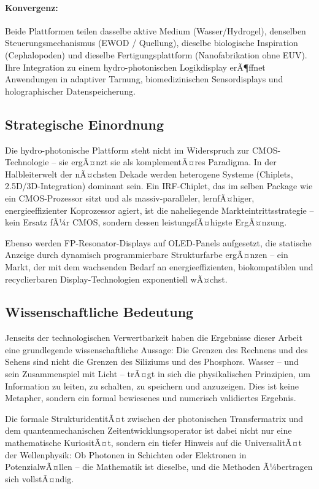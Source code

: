 ﻿\documentclass[a4paper,12pt]{scrreprt}
\theoremstyle{definition}
\begin{document}
\paragraph{Konvergenz:}
Beide Plattformen teilen dasselbe aktive Medium (Wasser/Hydrogel), denselben
Steuerungsmechanismus (EWOD / Quellung), dieselbe biologische Inspiration
(Cephalopoden) und dieselbe Fertigungsplattform (Nanofabrikation ohne EUV).
Ihre Integration zu einem hydro-photonischen Logikdisplay erÃ¶ffnet
Anwendungen in adaptiver Tarnung, biomedizinischen Sensordisplays und
holographischer Datenspeicherung.

\subsection{Strategische Einordnung}

Die hydro-photonische Plattform steht nicht im Widerspruch zur
CMOS-Technologie -- sie ergÃ¤nzt sie als komplementÃ¤res Paradigma.
In der Halbleiterwelt der nÃ¤chsten Dekade werden heterogene Systeme
(Chiplets, 2.5D/3D-Integration) dominant sein. Ein IRF-Chiplet, das im
selben Package wie ein CMOS-Prozessor sitzt und als massiv-paralleler,
lernfÃ¤higer, energieeffizienter Koprozessor agiert, ist die naheliegende
Markteintrittsstrategie -- kein Ersatz fÃ¼r CMOS, sondern dessen
leistungsfÃ¤higste ErgÃ¤nzung.

Ebenso werden FP-Resonator-Displays auf OLED-Panels aufgesetzt, die
statische Anzeige durch dynamisch programmierbare Strukturfarbe ergÃ¤nzen --
ein Markt, der mit dem wachsenden Bedarf an energieeffizienten,
biokompatiblen und recyclierbaren Display-Technologien exponentiell wÃ¤chst.

\subsection{Wissenschaftliche Bedeutung}

Jenseits der technologischen Verwertbarkeit haben die Ergebnisse dieser
Arbeit eine grundlegende wissenschaftliche Aussage: Die Grenzen des Rechnens
und des Sehens sind nicht die Grenzen des Siliziums und des Phosphors.
Wasser -- und sein Zusammenspiel mit Licht -- trÃ¤gt in sich die physikalischen
Prinzipien, um Information zu leiten, zu schalten, zu speichern und
anzuzeigen. Dies ist keine Metapher, sondern ein formal bewiesenes und
numerisch validiertes Ergebnis.

Die formale StrukturidentitÃ¤t zwischen der photonischen Transfermatrix und
dem quantenmechanischen Zeitentwicklungsoperator ist dabei nicht nur eine
mathematische KuriositÃ¤t, sondern ein tiefer Hinweis auf die UniversalitÃ¤t
der Wellenphysik: Ob Photonen in Schichten oder Elektronen in PotenzialwÃ¤llen --
die Mathematik ist dieselbe, und die Methoden Ã¼bertragen sich vollstÃ¤ndig.
\end{document}
